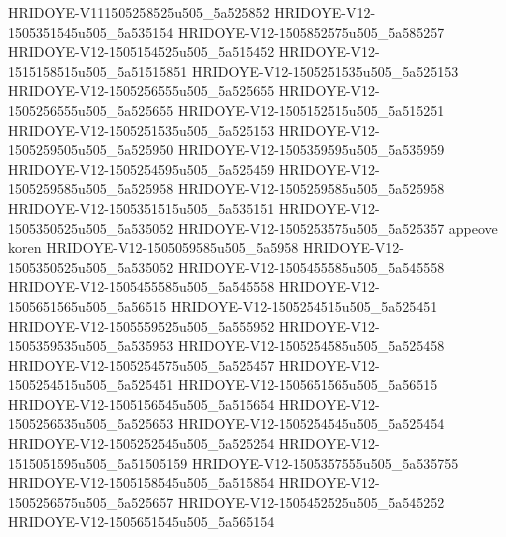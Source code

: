 HRIDOYE-V111505258525u505_5a525852
HRIDOYE-V12-1505351545u505_5a535154
HRIDOYE-V12-1505852575u505_5a585257 
HRIDOYE-V12-1505154525u505_5a515452
HRIDOYE-V12-1515158515u505_5a51515851
HRIDOYE-V12-1505251535u505_5a525153
HRIDOYE-V12-1505256555u505_5a525655
HRIDOYE-V12-1505256555u505_5a525655
HRIDOYE-V12-1505152515u505_5a515251
HRIDOYE-V12-1505251535u505_5a525153
HRIDOYE-V12-1505259505u505_5a525950
HRIDOYE-V12-1505359595u505_5a535959
HRIDOYE-V12-1505254595u505_5a525459
HRIDOYE-V12-1505259585u505_5a525958
HRIDOYE-V12-1505259585u505_5a525958
HRIDOYE-V12-1505351515u505_5a535151
HRIDOYE-V12-1505350525u505_5a535052
HRIDOYE-V12-1505253575u505_5a525357
appeove koren
HRIDOYE-V12-1505059585u505_5a5958
HRIDOYE-V12-1505350525u505_5a535052
HRIDOYE-V12-1505455585u505_5a545558
HRIDOYE-V12-1505455585u505_5a545558
HRIDOYE-V12-1505651565u505_5a56515
HRIDOYE-V12-1505254515u505_5a525451
HRIDOYE-V12-1505559525u505_5a555952
HRIDOYE-V12-1505359535u505_5a535953
HRIDOYE-V12-1505254585u505_5a525458
HRIDOYE-V12-1505254575u505_5a525457
HRIDOYE-V12-1505254515u505_5a525451
HRIDOYE-V12-1505651565u505_5a56515
HRIDOYE-V12-1505156545u505_5a515654
HRIDOYE-V12-1505256535u505_5a525653
HRIDOYE-V12-1505254545u505_5a525454
HRIDOYE-V12-1505252545u505_5a525254
HRIDOYE-V12-1515051595u505_5a51505159
HRIDOYE-V12-1505357555u505_5a535755
HRIDOYE-V12-1505158545u505_5a515854
HRIDOYE-V12-1505256575u505_5a525657
HRIDOYE-V12-1505452525u505_5a545252
HRIDOYE-V12-1505651545u505_5a565154
